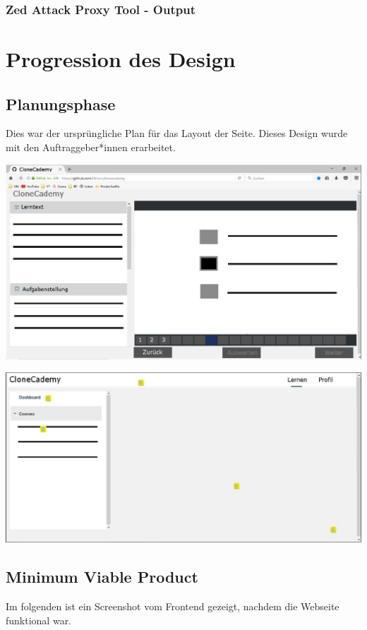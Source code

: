 \documentclass[accentcolor=tud0b,12pt,paper=a4]{tudreport}
\begin{document}
	\subsection*{Zed Attack Proxy Tool - Output}
	


\chapter{Progression des Design}

	\section*{Planungsphase}
	Dies war der ursprüngliche Plan für das Layout der Seite. Dieses Design wurde mit den Auftraggeber*innen erarbeitet.

	\includegraphics[height=0.3\textheight]{appendix/bilder/design_example_1-0.jpg}

	\includegraphics[height=0.3\textheight]{appendix/bilder/design_example_2-0.jpg}


	\section*{Minimum Viable Product}
	Im folgenden ist ein Screenshot vom Frontend gezeigt, nachdem die Webseite funktional war.
\end{document}
